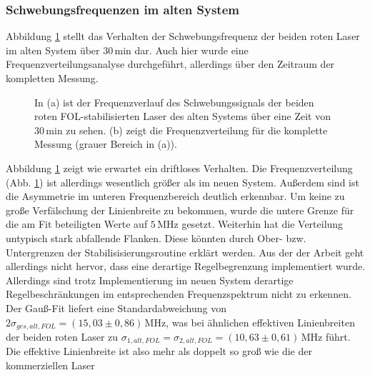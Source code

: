 \subsubsection{Schwebungsfrequenzen im alten
System}\label{subsubsec:beatfrequenzmessung_altes_system}
Abbildung \ref{fig:beatfrequenzen_alt_FOL} stellt das Verhalten der
Schwebungsfrequenz der beiden roten Laser im alten System über $30\,$min dar.
Auch hier wurde eine Frequenzverteilungsanalyse durchgeführt, allerdings über
den Zeitraum der kompletten Messung.
\begin{figure}[hp]
 	\centering
 	\footnotesize
 	\fbox{\parbox{\dimexpr \linewidth - 2\fboxrule - 2\fboxsep}{
 	\subfloat[]{
		\label{subfig:beatfrequenzen_alt_FOL_drift}
		
		}\\
 	\subfloat[]{
		\label{subfig:beatfrequenzen_alt_FOL_histogramm}
		
		}
	}}
	\caption[Beatfrequenzen - altes System mit FOL]{In (a) ist der
	Frequenzverlauf des Schwebungssignals der beiden roten
	FOL-stabilisierten Laser des alten Systems über eine Zeit von
	$30\,$min zu sehen. (b) zeigt die Frequenzverteilung für die komplette Messung
	(grauer Bereich in (a)).}
	\label{fig:beatfrequenzen_alt_FOL}
\end{figure}
Abbildung
\ref{fig:beatfrequenzen_alt_FOL} zeigt wie erwartet ein driftloses Verhalten. Die
Frequenzverteilung (Abb.
\ref{fig:beatfrequenzen_alt_FOL}) ist allerdings wesentlich größer als im neuen System. Außerdem sind ist die
Asymmetrie im unteren Frequenzbereich deutlich erkennbar. Um keine zu große
Verfälschung der Linienbreite zu bekommen, wurde die untere Grenze für die am
Fit beteiligten Werte auf $5\,$MHz gesetzt. Weiterhin hat die Verteilung
untypisch stark abfallende Flanken. Diese könnten durch Ober- bzw.
Untergrenzen der Stabilisisierungsroutine erklärt werden. Aus der der Arbeit
\cite{kuschnick:2000:diplomarbeit} geht allerdings nicht hervor, dass eine
derartige Regelbegrenzung implementiert wurde. Allerdings sind trotz
Implementierung im neuen System derartige Regelbeschränkungen im entsprechenden
Frequenzspektrum nicht zu erkennen. Der Gauß-Fit liefert eine Standardabweichung
von $2\sigma_{ges,alt,FOL}=(15,03\pm0,86)\,$MHz, was bei ähnlichen effektiven
Linienbreiten der beiden roten Laser zu
$\sigma_{1,alt,FOL}=\sigma_{2,alt,FOL}=(10,63\pm0,61)\,$MHz führt. Die effektive
Linienbreite ist also mehr als doppelt so groß wie die der kommerziellen Laser

